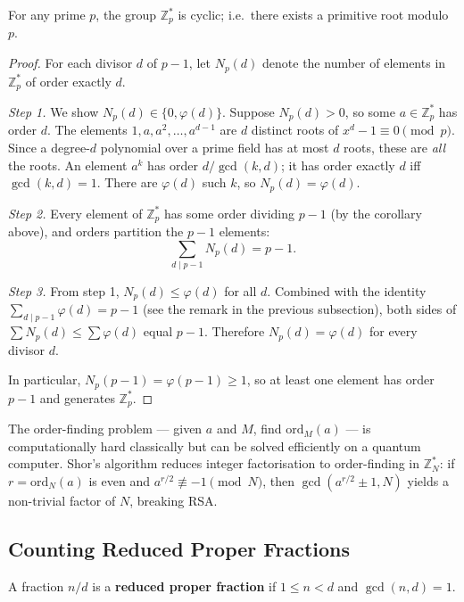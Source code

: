 \begin{theorem}
For any prime $p$, the group $\mathbb{Z}_p^*$ is cyclic; i.e.\ there exists a primitive root modulo $p$.
\end{theorem}
\begin{proof}
For each divisor $d$ of $p-1$, let $N_p(d)$ denote the number of elements in $\mathbb{Z}_p^*$ of order exactly $d$.

\textit{Step 1.} We show $N_p(d) \in \{0, \varphi(d)\}$. Suppose $N_p(d) > 0$, so some $a \in \mathbb{Z}_p^*$ has order $d$. The elements $1, a, a^2, \ldots, a^{d-1}$ are $d$ distinct roots of $x^d - 1 \equiv 0 \pmod p$. Since a degree-$d$ polynomial over a prime field has at most $d$ roots, these are \emph{all} the roots. An element $a^k$ has order $d/\gcd(k,d)$; it has order exactly $d$ iff $\gcd(k,d)=1$. There are $\varphi(d)$ such $k$, so $N_p(d) = \varphi(d)$.

\textit{Step 2.} Every element of $\mathbb{Z}_p^*$ has some order dividing $p-1$ (by the corollary above), and orders partition the $p-1$ elements:
\[
\sum_{d \mid p-1} N_p(d) = p-1.
\]

\textit{Step 3.} From step 1, $N_p(d) \le \varphi(d)$ for all $d$. Combined with the identity $\sum_{d \mid p-1} \varphi(d) = p-1$ (see the remark in the previous subsection), both sides of $\sum N_p(d) \le \sum \varphi(d)$ equal $p-1$. Therefore $N_p(d) = \varphi(d)$ for every divisor $d$.

In particular, $N_p(p-1) = \varphi(p-1) \ge 1$, so at least one element has order $p-1$ and generates $\mathbb{Z}_p^*$.
\end{proof}

\begin{remark}
The order-finding problem — given $a$ and $M$, find $\mathrm{ord}_M(a)$ — is computationally hard classically but can be solved efficiently on a quantum computer. Shor's algorithm reduces integer factorisation to order-finding in $\mathbb{Z}_N^*$: if $r = \mathrm{ord}_N(a)$ is even and $a^{r/2} \not\equiv -1 \pmod{N}$, then $\gcd(a^{r/2} \pm 1, N)$ yields a non-trivial factor of $N$, breaking RSA.
\end{remark}

\subsection{Counting Reduced Proper Fractions}

\begin{definition}
A fraction $n/d$ is a \textbf{reduced proper fraction} if $1 \le n < d$ and $\gcd(n,d)=1$.
\end{definition}

